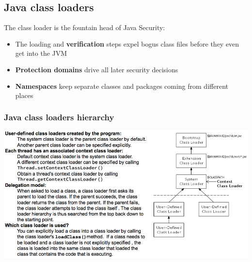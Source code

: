 \documentclass[10pt]{article}
\begin{document}
\subsection{Java class loaders}
The class loader is the fountain head of Java Security:
\begin{itemize}
	\item The loading and \textbf{verification} steps expel bogus class files before they even get into the JVM
	\item \textbf{Protection domains} drive all later security decisions
	\item \textbf{Namespaces} keep separate classes and packages coming from different places
\end{itemize}


\subsubsection{Java class loaders hierarchy}
\begin{center}
	\includegraphics[scale=0.5]{class_loaders-hierarchy.png}
\end{center}
\end{document}
